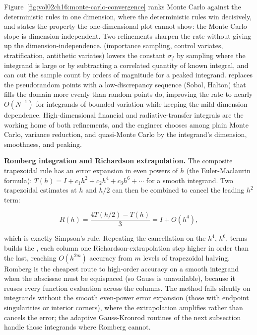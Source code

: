 Figure~\ref{fig:vol02ch16:monte-carlo-convergence} ranks Monte Carlo against
the deterministic rules in one dimension, where the deterministic rules win
decisively, and states the property the one-dimensional plot cannot show: the
Monte Carlo slope is dimension-independent. Two refinements sharpen the rate
without giving up the dimension-independence. 
(importance sampling, control variates, stratification, antithetic variates)
lowers the constant $\sigma_{f}$ by sampling where the integrand is large or by
subtracting a correlated quantity of known integral, and can cut the sample
count by orders of magnitude for a peaked integrand.  replaces the pseudorandom points with a low-discrepancy sequence (Sobol,
Halton) that fills the domain more evenly than random points do, improving the
rate to nearly $O(N^{-1})$ for integrands of bounded variation while keeping
the mild dimension dependence. High-dimensional financial and radiative-transfer
integrals are the working home of both refinements, and the engineer chooses
among plain Monte Carlo, variance reduction, and quasi-Monte Carlo by the
integrand's dimension, smoothness, and peaking.

\begin{mastery}
\textbf{Romberg integration and Richardson extrapolation.} The
composite trapezoidal rule has an error expansion in even powers of
$h$ (the Euler-Maclaurin formula): $T(h) = I + c_{1} h^{2} +
c_{2} h^{4} + c_{3} h^{6} + \cdots$ for a smooth integrand. Two
trapezoidal estimates at $h$ and $h/2$ can then be combined to
cancel the leading $h^{2}$ term:

\[
R(h) = \frac{4 T(h/2) - T(h)}{3} = I + O(h^{4}),
\]

which is exactly Simpson's rule. Repeating the cancellation on the
$h^{4}$, $h^{6}$, terms builds the , each
column one Richardson-extrapolation step higher in order than the
last, reaching $O(h^{2m})$ accuracy from $m$ levels of trapezoidal
halving. Romberg is the cheapest route to high-order accuracy on a
smooth integrand when the abscissae must be equispaced (so Gauss is
unavailable), because it reuses every function evaluation across the
columns. The method fails silently on integrands without the smooth
even-power error expansion (those with endpoint singularities or
interior corners), where the extrapolation amplifies rather than
cancels the error; the adaptive Gauss-Kronrod routines of the next
subsection handle those integrands where Romberg cannot.
\end{mastery}

